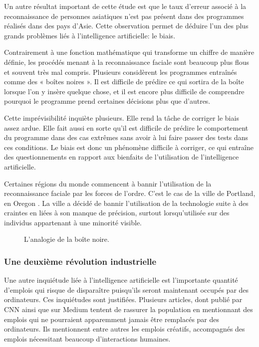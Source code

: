 \documentclass[letterpaper,10pt,french]{sphinxmanual}
\begin{document}
Un autre résultat important de cette étude est que le taux d’erreur associé à la
reconnaissance de personnes asiatiques n’est pas présent dans des programmes
réalisés dans des pays d’Asie. Cette observation permet de déduire l’un des plus
grands problèmes liés à l’intelligence artificielle: le biais.

Contrairement à une fonction mathématique qui transforme un chiffre de manière
définie, les procédés menant à la reconnaissance faciale sont beaucoup plus
flous et souvent très mal compris. Plusieurs considèrent les programmes
entraînés comme des « boîtes noires ». Il est difficile de prédire ce qui sortira
de la boîte lorsque l’on y insère quelque chose, et il est encore plus difficile
de comprendre pourquoi le programme prend certaines décisions plus que d’autres.

Cette imprévisibilité inquiète plusieurs. Elle rend la tâche de corriger le
biais assez ardue. Elle fait aussi en sorte qu’il est difficile de prédire le
comportement du programme dans des cas extrêmes sans avoir à lui faire passer
des tests dans ces conditions. Le biais est donc un phénomène difficile à
corriger, ce qui entraîne des questionnements en rapport aux bienfaits de
l’utilisation de l’intelligence artificielle.

Certaines régions du monde
commencent à bannir l’utilisation de la reconnaissance faciale par les forces
de l’ordre. C’est le cas de la ville de Portland, en Oregon .
La ville a décidé de bannir l’utilisation de la technologie suite à des craintes
en liées à son manque de précision, surtout lorsqu’utilisée sur des individus
appartenant à une minorité visible.

\begin{figure}[htbp]
\centering
\capstart

\noindent{}
\caption{L’analogie de la boîte noire.}\label{\detokenize{intro_finale:boite-noire}}\end{figure}


\subsubsection{Une deuxième révolution industrielle}
\label{\detokenize{intro_finale:une-deuxieme-revolution-industrielle}}
Une autre inquiétude liée à l’intelligence artificielle est l’importante
quantité d’emplois qui risque de disparaître puisqu’ils seront maintenant
occupés par des ordinateurs. Ces inquiétudes sont justifiées. Plusieurs articles,
dont
publié par CNN ainsi que
sur Medium tentent de rassurer la population en mentionnant des emplois qui ne
pourraient apparemment jamais être remplacés par des ordinateurs. Ils mentionnent
entre autres les emplois créatifs, accompagnés des emplois nécessitant beaucoup
d’interactions humaines.
\end{document}
